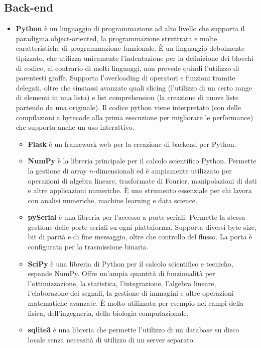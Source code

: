 \documentclass[12pt,a4paper,openright,twoside]{book}
\begin{document}
\subsection{Back-end}
\begin{itemize}
    \item \textbf{Python} è un linguaggio di programmazione ad alto livello che supporta il paradigma object-oriented, la programmazione struttrata e molte caratteristiche di programmazione funzionale. È un linguaggio debolmente tipizzato, che utilizza unicamente l'indentazione per la definizione dei blocchi di codice, al contrario di molti linguaggi, non prevede quindi l'utilizzo di parentesti graffe. Supporta l'overloading di operatori e funzioni tramite delegati, oltre che sinstassi avanzate quali slicing (l'utilizzo di un certo range di elementi in una lista) e list comprehension (la creazione di nuove liste partendo da una originale). Il codice python viene interpretato (con delle compilazioni a bytecode alla prima esecuzione per migliorare le performance) che supporta anche un uso interattivo.
    \begin{itemize}[noitemsep]
        \item \textbf{Flask} è un framework web per la creazione di backend per Python.
        \item \textbf{NumPy} è la libreria principale per il calcolo scientifico Python. Permette la gestione di array $n$-dimensionali ed è ampiamente utilizzato per operazioni di algebra lineare, trasformate di Fourier, manipolazioni di dati e altre applicazioni numeriche. È uno strumento essenziale per chi lavora con analisi numeriche, machine learning e data science.
        \item \textbf{pySerial} è una libreria per l'accesso a porte seriali. Permette la stessa gestione delle porte seriali su ogni piattaforma. Supporta diversi byte size, bit di parità e di fine messaggio, oltre che controllo del flusso. La porta è configurata per la trasmissione binaria.
        \item \textbf{SciPy} è una libreria di Python per il calcolo scientifico e tecnicho, espande NumPy. Offre un'ampia quantità di funzionalità per l'ottimizzazione, la statistica, l'integrazione, l'algebra lineare, l'elaborazone dei segnali, la gestione di immagini e altre operazioni matematiche avanzate. È molto utilizzata per esempio nei campi della fisica, dell'ingegneria, della biologia computazionale.
        \item \textbf{sqlite3} è una libreria che permette l'utilizzo di un database su disco locale senza necessità di utilizzo di un server separato.
    \end{itemize}
\end{itemize}
\end{document}
